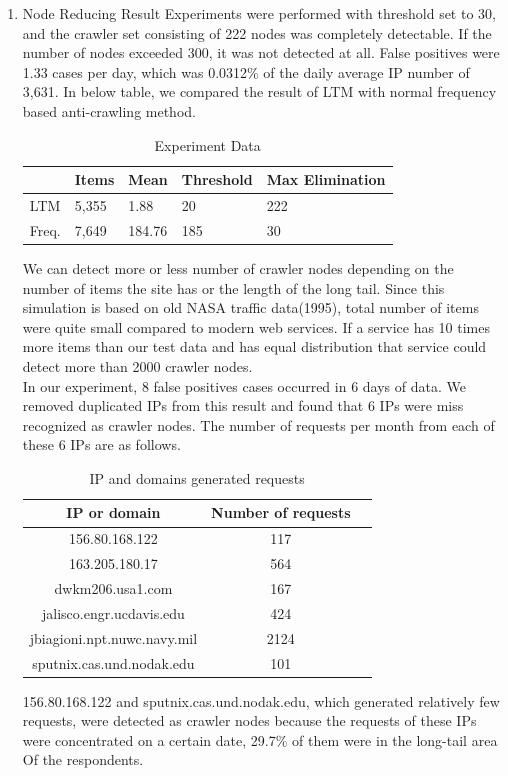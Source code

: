 \documentclass[sigconf,anonymous=true]{acmart}
\begin{document}
\begin{enumerate}
\item Node Reducing Result
\newline 
Experiments were performed with threshold set to 30, and the crawler set consisting of 222 nodes was completely detectable. If the number of nodes exceeded 300, it was not detected at all. False positives were 1.33 cases per day, which was 0.0312\% of the daily average IP number of 3,631. In below table, we compared the result of LTM with normal frequency based anti-crawling method.

\begin{table}[H]
  \caption{Experiment Data}
    \begin{tabular}{| l | l | l | l | l | }
    \hline
    & Items & Mean & Threshold & Max Elimination \\ \hline
    LTM & 5,355 & 1.88 & 20 & 222 \\ 
    Freq. & 7,649 & 184.76 & 185 & 30 \\ \hline
    \end{tabular}
\end{table}

We can detect more or less number of crawler nodes depending on the number of items the site has or the length of the long tail. Since this simulation is based on old NASA traffic data(1995), total number of items were quite small compared to modern web services. If a service has 10 times more items than our test data and has equal distribution that service could detect more than 2000 crawler nodes.\\
In our experiment, 8 false positives cases occurred in 6 days of data. We removed duplicated IPs from this result and found that 6 IPs were miss recognized as crawler nodes. The number of requests per month from each of these 6 IPs are as follows. 


\begin{table}[H]
  \caption{IP and domains generated requests}
  \label{tab:freq}
  \begin{tabular}{ccl}
    \toprule
    IP or domain&Number of requests\\
    \midrule
    156.80.168.122 & 117\\
    163.205.180.17 & 564\\
    dwkm206.usa1.com & 167\\
    jalisco.engr.ucdavis.edu & 424\\
    jbiagioni.npt.nuwc.navy.mil & 2124\\
    sputnix.cas.und.nodak.edu & 101\\
  \bottomrule
\end{tabular}
\end{table}


156.80.168.122 and sputnix.cas.und.nodak.edu, which generated relatively few requests, were detected as crawler nodes because the requests of these IPs were concentrated on a certain date, 29.7\% of them were in the long-tail area Of the respondents.

\end{enumerate}
\end{document}
